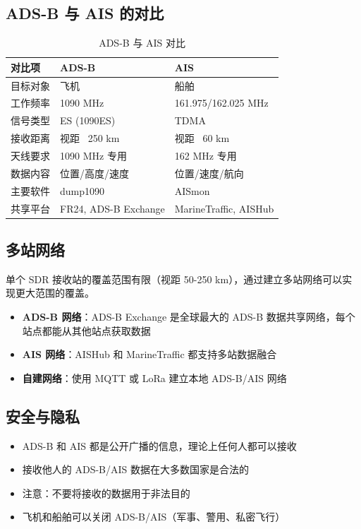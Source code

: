 \documentclass[12pt,UTF8]{ctexbook}
\begin{document}
\subsection{ADS-B 与 AIS 的对比}
\begin{table}[htbp]
\centering
\caption{ADS-B 与 AIS 对比}
\label{tab:adsb_ais}
\begin{tabular}{@{}lll@{}}
    \toprule
    \textbf{对比项} & \textbf{ADS-B} & \textbf{AIS} \\
    \midrule
    目标对象 & 飞机 & 船舶 \\
    工作频率 & 1090 MHz & 161.975/162.025 MHz \\
    信号类型 & ES (1090ES) & TDMA \\
    接收距离 & 视距 ~250 km & 视距 ~60 km \\
    天线要求 & 1090 MHz 专用 & 162 MHz 专用 \\
    数据内容 & 位置/高度/速度 & 位置/速度/航向 \\
    主要软件 & dump1090 & AISmon \\
    共享平台 & FR24, ADS-B Exchange & MarineTraffic, AISHub \\
    \bottomrule
\end{tabular}
\end{table}

\subsection{多站网络}
\label{subsec:multistation}

单个 SDR 接收站的覆盖范围有限（视距 50-250 km），通过建立多站网络可以实现更大范围的覆盖。
\begin{itemize}[leftmargin=2cm]
    \item \textbf{ADS-B 网络}：ADS-B Exchange 是全球最大的 ADS-B 数据共享网络，每个站点都能从其他站点获取数据
    \item \textbf{AIS 网络}：AISHub 和 MarineTraffic 都支持多站数据融合
    \item \textbf{自建网络}：使用 MQTT 或 LoRa 建立本地 ADS-B/AIS 网络
\end{itemize}

\subsection{安全与隐私}
\label{subsec:privacy}
\begin{itemize}[leftmargin=2cm]
    \item ADS-B 和 AIS 都是公开广播的信息，理论上任何人都可以接收
    \item 接收他人的 ADS-B/AIS 数据在大多数国家是合法的
    \item 注意：不要将接收的数据用于非法目的
    \item 飞机和船舶可以关闭 ADS-B/AIS（军事、警用、私密飞行）
\end{itemize}
\end{document}
